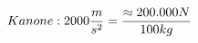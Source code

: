 \documentclass[preview]{standalone}
\begin{document}
\begin{align*}
\special{dvisvgm:raw <g id='unique000'>}Kanone: 2000 \frac{m}{s^{2}} = \frac{\approx 200.000 N}{100 kg}\special{dvisvgm:raw </g>}
\end{align*}
\end{document}
